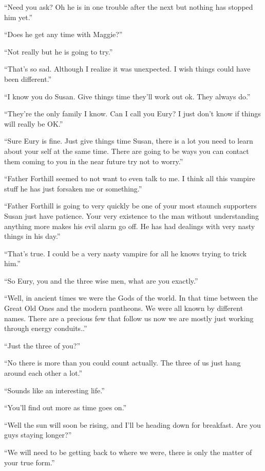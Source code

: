 ``Need you ask? Oh he is in one trouble after the next but nothing has stopped him yet.''

``Does he get any time with Maggie?''

``Not really but he is going to try.''

``That's so sad. Although I realize it was unexpected. I wish things could have been different.''

``I know you do Susan. Give things time they'll work out ok. They always do.''

``They're the only family I know. Can I call you Eury? I just don't know if things will really be OK.''

``Sure Eury is fine. Just give things time Susan, there is a lot you need to learn about your self at the same time. There are going to be ways you can contact them coming to you in the near future try not to worry.''

``Father Forthill seemed to not want to even talk to me. I think all this vampire stuff he has just forsaken me or something.''

``Father Forthill is going to very quickly be one of your most staunch supporters Susan just have patience. Your very existence to the man without understanding anything more makes his evil alarm go off. He has had dealings with very nasty things in his day.''

``That's true. I could be a very nasty vampire for all he knows trying to trick him.''

``So Eury, you and the three wise men, what are you exactly.''

``Well, in ancient times we were the Gods of the world. In that time between the Great Old Ones and the modern pantheons. We were all known by different names. There are a precious few that follow us now we are mostly just working through energy conduits..''

``Just the three of you?''

``No there is more than you could count actually. The three of us just hang around each other a lot.''

``Sounds like an interesting life.''

``You'll find out more as time goes on.''

``Well the sun will soon be rising, and I'll be heading down for breakfast. Are you guys staying longer?''

``We will need to be getting back to where we were, there is only the matter of your true form.''

